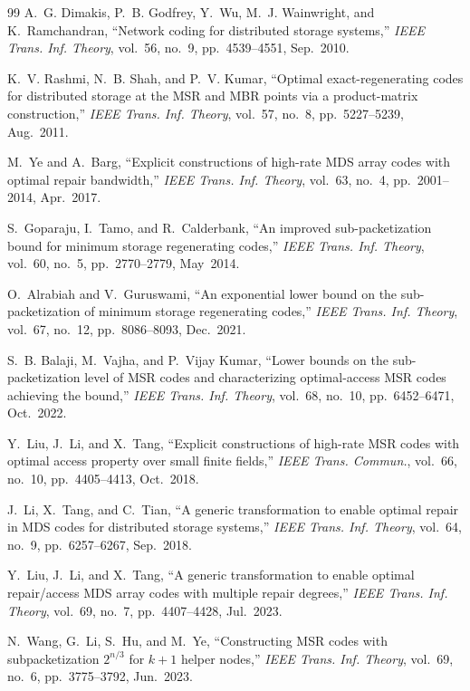 \documentclass[11pt,onecolumn]{IEEEtran}
\begin{document}
\begin{thebibliography}{99}
A.~G. Dimakis, P.~B. Godfrey, Y.~Wu, M.~J. Wainwright, and K.~Ramchandran,
``Network coding for distributed storage systems,''
\emph{IEEE Trans. Inf. Theory}, vol.~56, no.~9, pp.~4539--4551, Sep.~2010.

K.~V. Rashmi, N.~B. Shah, and P.~V. Kumar,
``Optimal exact-regenerating codes for distributed storage at the MSR and MBR points via a product-matrix construction,''
\emph{IEEE Trans. Inf. Theory}, vol.~57, no.~8, pp.~5227--5239, Aug.~2011.

M.~Ye and A.~Barg,
``Explicit constructions of high-rate MDS array codes with optimal repair bandwidth,''
\emph{IEEE Trans. Inf. Theory}, vol.~63, no.~4, pp.~2001--2014, Apr.~2017.

S.~Goparaju, I.~Tamo, and R.~Calderbank,
``An improved sub-packetization bound for minimum storage regenerating codes,''
\emph{IEEE Trans. Inf. Theory}, vol.~60, no.~5, pp.~2770--2779, May~2014.

O.~Alrabiah and V.~Guruswami,
``An exponential lower bound on the sub-packetization of minimum storage regenerating codes,''
\emph{IEEE Trans. Inf. Theory}, vol.~67, no.~12, pp.~8086--8093, Dec.~2021.

S.~B. Balaji, M.~Vajha, and P.~Vijay Kumar,
``Lower bounds on the sub-packetization level of MSR codes and characterizing optimal-access MSR codes achieving the bound,''
\emph{IEEE Trans. Inf. Theory}, vol.~68, no.~10, pp.~6452--6471, Oct.~2022.

Y.~Liu, J.~Li, and X.~Tang,
``Explicit constructions of high-rate MSR codes with optimal access property over small finite fields,''
\emph{IEEE Trans. Commun.}, vol.~66, no.~10, pp.~4405--4413, Oct.~2018.

J.~Li, X.~Tang, and C.~Tian,
``A generic transformation to enable optimal repair in MDS codes for distributed storage systems,''
\emph{IEEE Trans. Inf. Theory}, vol.~64, no.~9, pp.~6257--6267, Sep.~2018.

Y.~Liu, J.~Li, and X.~Tang,
``A generic transformation to enable optimal repair/access MDS array codes with multiple repair degrees,''
\emph{IEEE Trans. Inf. Theory}, vol.~69, no.~7, pp.~4407--4428, Jul.~2023.

N.~Wang, G.~Li, S.~Hu, and M.~Ye,
``Constructing MSR codes with subpacketization $2^{n/3}$ for $k+1$ helper nodes,''
\emph{IEEE Trans. Inf. Theory}, vol.~69, no.~6, pp.~3775--3792, Jun.~2023.


\end{thebibliography}
\end{document}
